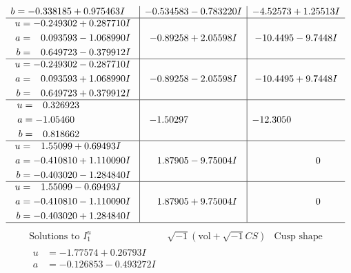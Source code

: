 \documentclass[1p]{elsarticle_modified}
\theoremstyle{definition}
\newcommand{\I}{\sqrt{-1}}
\begin{document}
$$\begin{array}{c|c|c}
\begin{aligned}
b &= -0.338185 + 0.975463 I\end{aligned}
 & -0.534583 - 0.783220 I & -4.52573 + 1.25513 I \\ \hline\begin{aligned}
u &= -0.249302 + 0.287710 I \\
a &= \phantom{-}0.093593 - 1.068990 I \\
b &= \phantom{-}0.649723 - 0.379912 I\end{aligned}
 & -0.89258 + 2.05598 I & -10.4495 - 9.7448 I \\ \hline\begin{aligned}
u &= -0.249302 - 0.287710 I \\
a &= \phantom{-}0.093593 + 1.068990 I \\
b &= \phantom{-}0.649723 + 0.379912 I\end{aligned}
 & -0.89258 - 2.05598 I & -10.4495 + 9.7448 I \\ \hline\begin{aligned}
u &= \phantom{-}0.326923\phantom{ +0.000000I} \\
a &= -1.05460\phantom{ +0.000000I} \\
b &= \phantom{-}0.818662\phantom{ +0.000000I}\end{aligned}
 & -1.50297\phantom{ +0.000000I} & -12.3050\phantom{ +0.000000I} \\ \hline\begin{aligned}
u &= \phantom{-}1.55099 + 0.69493 I \\
a &= -0.410810 + 1.110090 I \\
b &= -0.403020 - 1.284840 I\end{aligned}
 & \phantom{-}1.87905 - 9.75004 I & \phantom{-0.000000 } 0 \\ \hline\begin{aligned}
u &= \phantom{-}1.55099 - 0.69493 I \\
a &= -0.410810 - 1.110090 I \\
b &= -0.403020 + 1.284840 I\end{aligned}
 & \phantom{-}1.87905 + 9.75004 I & \phantom{-0.000000 } 0\\
 \hline 
 \end{array}$$\newpage$$\begin{array}{c|c|c}  
\text{Solutions to }I^u_{1}& \I (\text{vol} + \sqrt{-1}CS) & \text{Cusp shape}\\
 \hline 
\begin{aligned}
u &= -1.77574 + 0.26793 I \\
a &= -0.126853 - 0.493272 I \\

\end{aligned}
\end{array}$$
\end{document}

